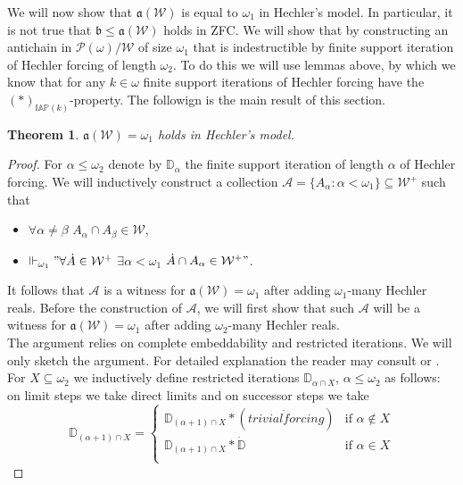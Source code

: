 \documentclass[a4paper]{amsart}
\newtheorem{theorem}{Theorem}[section]
\newcommand{\aaa}{\mathfrak{a}}
\newcommand{\bbb}{\mathfrak{b}}
\newcommand{\WANDER}{\mathcal{W}}
\newcommand{\IAP}{\mathbb{IAP}}
\begin{document}
We will now show that $\aaa(\WANDER)$ is equal to $\omega_{1}$ in Hechler's model. In particular, it is not true that $\bbb\leq\aaa(\WANDER)$ holds in ZFC. We will show that by constructing an antichain in $\mathcal{P}(\omega)/\WANDER$ of size $\omega_{1}$ that is indestructible by finite support iteration of Hechler forcing of length $\omega_{2}$. To do this we will use  lemmas above, by which we know that for any $k\in\omega$ finite support iterations of Hechler forcing have the $(*)_{\IAP(k)}$-property. The followign is the main result of this section.
\begin{theorem}\label{theoremHechlerWander}
    $\aaa(\WANDER)=\omega_{1}$ holds in Hechler's model.
\end{theorem}
\begin{proof}
    For $\alpha\leq\omega_{2}$ denote by $\mathbb{D}_{\alpha}$ the finite support iteration of length $\alpha$ of Hechler forcing. We will inductively construct a collection $\mathcal{A}=\{A_{\alpha}:\alpha<\omega_{1}\}\subseteq\WANDER^{+}$ such that 
    \begin{itemize}
        \item[--] $\forall \alpha\neq\beta$ $A_{\alpha}\cap A_{\beta}\in\WANDER$,
        \item[--] $\Vdash_{\omega_{1}}"\forall \dot{A}\in\WANDER^{+}$ $\exists\alpha<\omega_{1}$ $\dot{A}\cap A_{\alpha}\in\WANDER^{+}"$.
    \end{itemize}
    It follows that $\mathcal{A}$ is a witness for $\aaa(\WANDER)=\omega_{1}$ after adding $\omega_{1}$-many Hechler reals. Before the construction of $\mathcal{A}$, we will first show that such $\mathcal{A}$ will be a witness for $\aaa(\WANDER)=\omega_{1}$ after adding $\omega_{2}$-many Hechler reals.\\
    The argument relies on complete embeddability and restricted iterations. We will only sketch the argument. For detailed explanation the reader may consult \cite{Yoryoka} or \cite{BrendleAntichains}.\\
    For $X\subseteq\omega_{2}$ we inductively define restricted iterations $\mathbb{D}_{\alpha\cap X}$, $\alpha\leq\omega_{2}$ as follows:
    on limit steps we take direct limits and on successor steps we take
    \begin{equation*}
        \mathbb{D}_{(\alpha+1)\cap X} =
        \begin{cases}
             \mathbb{D}_{(\alpha+1)\cap X}*(\dot{trivial forcing}) & \text{if } \alpha\notin X\\
             \mathbb{D}_{(\alpha+1)\cap X}*\dot{\mathbb{D}} & \text{if } \alpha\in X\\

\end{cases}
\end{equation*}
\end{proof}
\end{document}
